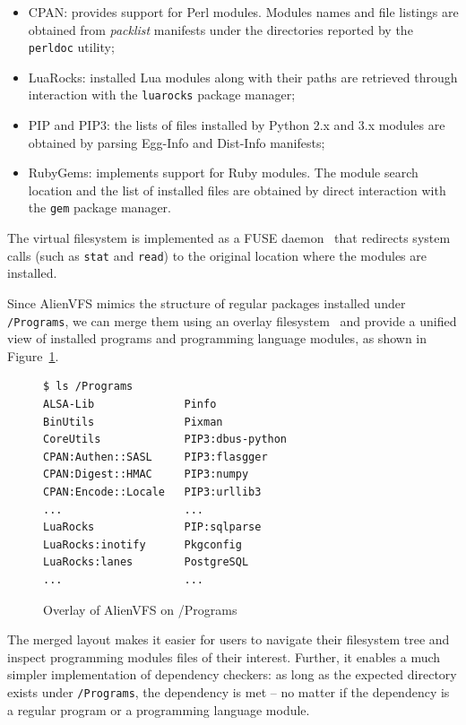 \documentclass[sigplan, anonymous, 10pt]{acmart}
\begin{document}
\begin{itemize}
    \item CPAN: provides support for Perl modules. Modules names and file listings
        are obtained from \emph{packlist} manifests under the directories reported
        by the \texttt{perldoc} utility;
    \item LuaRocks: installed Lua modules along with their paths are retrieved
        through interaction with the \texttt{lua\-rocks} package manager;
    \item PIP and PIP3: the lists of files installed by Python 2.x and 3.x modules
        are obtained by parsing Egg-Info and Dist-Info manifests;
    \item RubyGems: implements support for Ruby modules. The module search location
        and the list of installed files are obtained by direct interaction with the
        \texttt{gem} package manager.
\end{itemize}

The virtual filesystem is implemented as a FUSE daemon~\cite{miklos2001:fuse} that
redirects system calls (such as \texttt{stat} and \texttt{read}) to the original
location where the modules are installed.

Since AlienVFS mimics the structure of regular packages installed under
\texttt{/Programs}, we can merge them using an overlay filesystem~\cite{brown2018:overlayfs}
and provide a unified view of installed programs and programming language modules, as
shown in Figure~\ref{fig:alienvfs.merged}.

\begin{figure}[h]
    \begin{Verbatim}[frame=single]
$ ls /Programs
ALSA-Lib              Pinfo
BinUtils              Pixman
CoreUtils             PIP3:dbus-python
CPAN:Authen::SASL     PIP3:flasgger
CPAN:Digest::HMAC     PIP3:numpy
CPAN:Encode::Locale   PIP3:urllib3
...                   ...
LuaRocks              PIP:sqlparse
LuaRocks:inotify      Pkgconfig
LuaRocks:lanes        PostgreSQL
...                   ...
    \end{Verbatim}
    \caption{Overlay of AlienVFS on /Programs}
    \label{fig:alienvfs.merged}
\end{figure}

The merged layout makes it easier for users to navigate their filesystem tree
and inspect programming modules files of their interest. Further, it enables a
much simpler implementation of dependency checkers: as long as the expected
directory exists under \texttt{/Programs}, the dependency is met -- no matter if the
dependency is a regular program or a programming language module.
\end{document}
